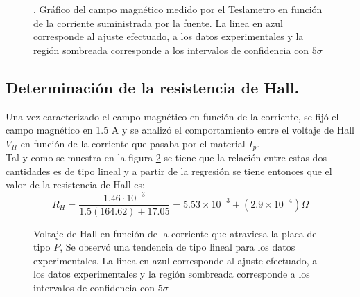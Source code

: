 \documentclass[%
 reprint,
 amsmath,amssymb,
 aps,
]{revtex4-1}
\begin{document}
\begin{figure}[h]
\caption{\label{Calibracion}. Gráfico del campo magnético medido por el Teslametro en función de la corriente suministrada por la fuente. La linea en azul corresponde al ajuste efectuado, a los datos experimentales y la región sombreada corresponde a los intervalos de confidencia con $5\sigma$}
\end{figure}

\subsection{Determinación de la resistencia de Hall.}
Una vez caracterizado el campo magnético en función de la corriente, se fijó el campo magnético en 1.5 A y se analizó el comportamiento entre el voltaje de Hall $V_H$ en función de la corriente que pasaba por el material $I_p$.\\
Tal y como se muestra en la figura \ref{V_H_vs_I_p} se tiene que la relación entre estas dos cantidades es de tipo lineal y a partir de la regresión se tiene entonces que el valor de la resistencia de Hall es:
\[R_H=\frac{1.46\cdot 10^{-3}}{1.5(164.62)+17.05}=5.53\times 10^{-3} \pm (2.9\times 10^{-4}) \Omega\]
\begin{figure}[h]
\caption{\label{V_H_vs_I_p}Voltaje de Hall en función de la corriente que atraviesa la placa de tipo $P$, Se observó una tendencia de tipo lineal para los datos experimentales. La linea en azul corresponde al ajuste efectuado, a los datos experimentales y la región sombreada corresponde a los intervalos de confidencia con $5\sigma$}
\end{figure}
\end{document}
